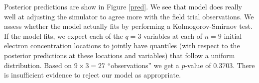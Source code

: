 Posterior predictions are show in Figure \ref{pred}. We see that model does really well at adjusting the simulator to agree more with the field trial observations. We assess whether the model actually fits by performing a Kolmogorov-Smirnov test. If the model fits, we expect each of the $q=3$ variables at each of $n=9$ initial electron concentration locations to jointly have quantiles (with respect to the posterior predictions at these locations and variables) that follow a uniform distribution. Based on $9\times3=27$ ``observations'' we get a $p$-value of $0.3703$. There is insufficient evidence to reject our model as appropriate.

